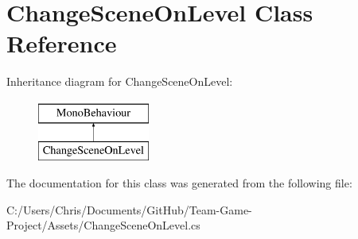 \hypertarget{class_change_scene_on_level}{}\section{Change\+Scene\+On\+Level Class Reference}
\label{class_change_scene_on_level}
Inheritance diagram for Change\+Scene\+On\+Level\+:\begin{figure}[H]
\begin{center}
\leavevmode
\includegraphics[height=2.000000cm]{class_change_scene_on_level}
\end{center}
\end{figure}


The documentation for this class was generated from the following file\+:\begin{DoxyCompactItemize}
\item 
C\+:/\+Users/\+Chris/\+Documents/\+Git\+Hub/\+Team-\/\+Game-\/\+Project/\+Assets/Change\+Scene\+On\+Level.\+cs\end{DoxyCompactItemize}

